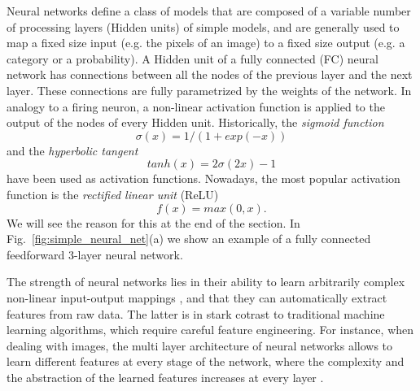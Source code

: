 Neural networks define a class of models that are composed of a variable number of processing layers (Hidden units) of simple models, and are generally used to map a fixed size input (e.g. the pixels of an image) to a fixed size output (e.g. a category or a probability). A Hidden unit of a fully connected (FC) neural network has connections between all the nodes of the previous layer and the next layer. These connections are fully parametrized by the weights of the network. In analogy to a firing neuron, a non-linear activation function is applied to the output of the nodes of every Hidden unit. Historically, the \textit{sigmoid function}
$$\sigma(x) = 1/(1 + exp(-x))$$
and the \textit{hyperbolic tangent}
$$tanh(x) = 2\sigma(2x) - 1$$ 
have been used as activation functions. Nowadays, the most popular activation function is the \textit{rectified linear unit} (ReLU)
$$f(x) = max(0,x).$$
We will see the reason for this at the end of the section. 
In Fig.~\ref{fig:simple_neural_net}(a) we show an example of a fully connected feedforward 3-layer neural network. 

The strength of neural networks lies in their ability to learn arbitrarily complex non-linear input-output mappings \parencite{cybenko1989}, and that they can automatically extract features from raw data. The latter is in stark cotrast to traditional machine learning algorithms, which require careful feature engineering. For instance, when dealing with images, the multi layer architecture of neural networks allows to learn different features at every stage of the network, where the complexity and the abstraction of the learned features increases at every layer \parencite{farabet2013}.

